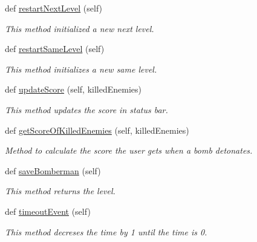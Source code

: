 \begin{DoxyCompactItemize}
def \hyperlink{classsrc_1_1board_1_1_board_aa7b557053364da15e7a150537bf37757}{restart\+Next\+Level} (self)
\begin{DoxyCompactList}\small\item\em This method initialized a new next level. \end{DoxyCompactList}\item 
def \hyperlink{classsrc_1_1board_1_1_board_a962e440ddb9556ca233a686d3d9f1be0}{restart\+Same\+Level} (self)
\begin{DoxyCompactList}\small\item\em This method initializes a new same level. \end{DoxyCompactList}\item 
\hypertarget{classsrc_1_1board_1_1_board_a69b2b3031f0df523ba3dbeab4bfd3fb2}{}def \hyperlink{classsrc_1_1board_1_1_board_a69b2b3031f0df523ba3dbeab4bfd3fb2}{update\+Score} (self, killed\+Enemies)\label{classsrc_1_1board_1_1_board_a69b2b3031f0df523ba3dbeab4bfd3fb2}

\begin{DoxyCompactList}\small\item\em This method updates the score in status bar. \end{DoxyCompactList}\item 
def \hyperlink{classsrc_1_1board_1_1_board_a6a27183b76d873505d619fc6b78935b9}{get\+Score\+Of\+Killed\+Enemies} (self, killed\+Enemies)
\begin{DoxyCompactList}\small\item\em Method to calculate the score the user gets when a bomb detonates. \end{DoxyCompactList}\item 
def \hyperlink{classsrc_1_1board_1_1_board_a1320cdff86fe637b41b8973cf6bcb499}{save\+Bomberman} (self)
\begin{DoxyCompactList}\small\item\em This method returns the level. \end{DoxyCompactList}\item 
def \hyperlink{classsrc_1_1board_1_1_board_afa56e069dac6b7cdc60ba45e91d1745c}{timeout\+Event} (self)
\begin{DoxyCompactList}\small\item\em This method decreses the time by 1 until the time is 0. \end{DoxyCompactList}\end{DoxyCompactItemize}
